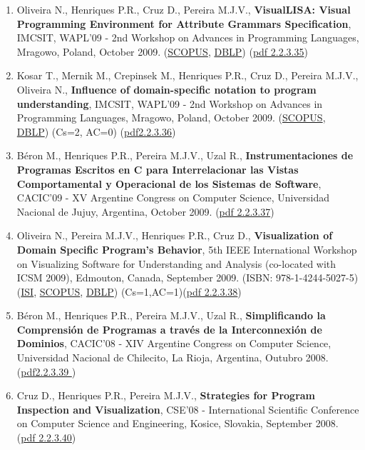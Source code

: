 \documentclass[11pt]{article}
\begin{document}
\begin{enumerate}
\item {Oliveira N., Henriques P.R., Cruz D., Pereira M.J.V., {\bf{ VisualLISA: Visual Programming Environment for Attribute Grammars Specification}}, IMCSIT, WAPL'09 - 2nd Workshop on Advances in Programming Languages, Mragowo, Poland, October 2009. (\href{run:Publicacoes/PublicacoesSCOPUS.pdf}{SCOPUS}, \href{run:Publicacoes/ComprovativosDBLP.pdf}{DBLP}) (\href{run:Publicacoes/publicacoes/44.pdf}{pdf 2.2.3.35})}
\item {Kosar T., Mernik M., Crepinsek M., Henriques P.R., Cruz D., Pereira M.J.V., Oliveira N., {\bf{ Influence of domain-specific notation to program understanding}}, IMCSIT, WAPL'09 - 2nd Workshop on Advances in Programming Languages, Mragowo, Poland, October 2009. (\href{run:Publicacoes/PublicacoesSCOPUS.pdf}{SCOPUS}, \href{run:Publicacoes/ComprovativosDBLP.pdf}{DBLP}) (Cs=2, AC=0) (\href{run:Publicacoes/publicacoes/43.pdf}{pdf2.2.3.36})}
\item {Béron M., Henriques P.R., Pereira M.J.V., Uzal R., {\bf{ Instrumentaciones de Programas Escritos en C para Interrelacionar las Vistas Comportamental y Operacional de los Sistemas de Software}}, CACIC'09 - XV Argentine Congress on Computer Science, Universidad Nacional de Jujuy, Argentina, October 2009. (\href{run:Publicacoes/publicacoes/42.pdf}{pdf 2.2.3.37})}
\item {Oliveira N., Pereira M.J.V., Henriques P.R., Cruz D., {\bf{ Visualization of Domain Specific Program's Behavior}}, 5th IEEE International Workshop on Visualizing Software for Understanding and Analysis (co-located with ICSM 2009), Edmouton, Canada, September 2009. (ISBN: 978-1-4244-5027-5) (\href{run:Publicacoes/ComprovativosISI.pdf}{ISI}, \href{run:Publicacoes/PublicacoesSCOPUS.pdf}{SCOPUS}, \href{run:Publicacoes/ComprovativosDBLP.pdf}{DBLP}) (Cs=1,AC=1)(\href{run:Publicacoes/publicacoes/48.pdf}{pdf 2.2.3.38})}
\item {Béron M., Henriques P.R., Pereira M.J.V., Uzal R., {\bf{ Simplificando la Comprensión de Programas a través de la Interconnexión de Dominios}}, CACIC'08 - XIV Argentine Congress on Computer Science, Universidad Nacional de Chilecito, La Rioja, Argentina, Outubro 2008. (\href{run:Publicacoes/publicacoes/36.pdf}{pdf2.2.3.39 })}
\item {Cruz D., Henriques P.R., Pereira M.J.V., {\bf{ Strategies for Program Inspection and Visualization}}, CSE'08 - International Scientific Conference on Computer Science and Engineering, Kosice, Slovakia, September 2008. (\href{run:Publicacoes/publicacoes/31.pdf}{pdf 2.2.3.40})}

\end{enumerate}
\end{document}
